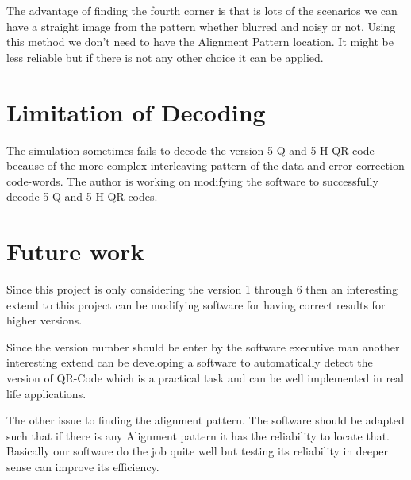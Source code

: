 The advantage of finding the fourth corner is that is lots of the scenarios we can have a straight image from the pattern whether blurred and noisy or not. Using this method we don't need to have the Alignment Pattern location. It might be less reliable but if there is not any other choice it can be applied.
\section{Limitation of Decoding}

The simulation sometimes fails to decode the version 5-Q and 5-H QR code because of the more complex interleaving pattern of the data and error correction code-words. The author is working on modifying the software to successfully decode 5-Q and 5-H QR codes.

\section{Future work}

Since this project is only considering the version 1 through 6 then an interesting extend to this project can be modifying software for having correct results for higher versions.

Since the version number should be enter by the software executive man another interesting extend can be developing a software to automatically detect the version of QR-Code which is a practical task and can be well implemented in real life applications.

The other issue to finding the alignment pattern. The software should be adapted such that if there is any Alignment pattern it has the reliability to locate that. Basically our software do the job quite well but testing its reliability in deeper sense can improve its efficiency.